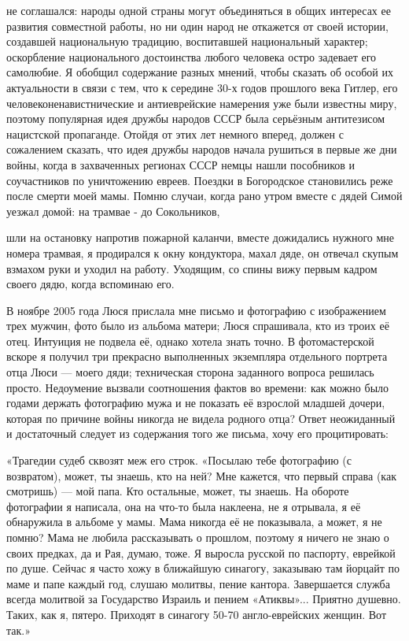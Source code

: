 \label{48-1}
не соглашался: народы одной страны могут объединяться в общих интересах ее развития совместной работы, но ни один народ не откажется от своей истории, создавшей национальную традицию, воспитавшей национальный характер; оскорбление национального достоинства любого человека остро задевает его самолюбие. Я обобщил содержание разных мнений, чтобы сказать об особой их актуальности в связи с тем, что к середине 30-х годов прошлого века Гитлер, его человеконенавистнические и антиеврейские намерения уже были известны миру, поэтому популярная идея дружбы народов СССР была серьёзным антитезисом нацистской пропаганде. Отойдя от этих лет немного вперед, должен с сожалением сказать, что идея дружбы народов начала рушиться в первые же дни войны, когда в захваченных регионах СССР немцы нашли пособников и соучастников по уничтожению евреев. Поездки в Богородское становились реже после смерти моей мамы. Помню случаи, когда рано утром вместе с дядей Симой уезжал домой: на трамвае - до Сокольников,

\label{49-1}
шли на остановку напротив пожарной каланчи, вместе дожидались нужного мне номера трамвая, я продирался к окну кондуктора, махал дяде, он отвечал скупым взмахом руки и уходил на работу. Уходящим, со спины вижу первым кадром своего дядю, когда вспоминаю его.

\label{49-2}
В ноябре 2005 года Люся прислала мне письмо и фотографию с изображением трех мужчин, фото было из альбома матери; Люся спрашивала, кто из троих её отец. Интуиция не подвела её, однако хотела знать точно. В фотомастерской вскоре я получил три прекрасно выполненных экземпляра отдельного портрета отца Люси — моего дяди; техническая сторона заданного вопроса решилась просто. Недоумение вызвали соотношения фактов во времени: как можно было годами держать фотографию мужа и не показать её взрослой младшей дочери, которая по причине войны никогда не видела родного отца? Ответ неожиданный и достаточный следует из содержания того же письма, хочу его процитировать:

\label{50-1}
«Трагедии судеб сквозят меж его строк. «Посылаю тебе фотографию (с возвратом), может, ты знаешь, кто на ней? Мне кажется, что первый справа (как смотришь) — мой папа. Кто остальные, может, ты знаешь. На обороте фотографии я написала, она на что-то была наклеена, не я отрывала, я её обнаружила в альбоме у мамы. Мама никогда её не показывала, а может, я не помню? Мама не любила рассказывать о прошлом, поэтому я ничего не знаю о своих предках, да и Рая, думаю, тоже. Я выросла русской по паспорту, еврейкой по душе. Сейчас я часто хожу в ближайшую синагогу, заказываю там йорцайт по маме и папе каждый год, слушаю молитвы, пение кантора. Завершается служба всегда молитвой за Государство Израиль и пением «Атиквы»... Приятно душевно. Таких, как я, пятеро. Приходят в синагогу 50-70 англо-еврейских женщин. Вот так.»

